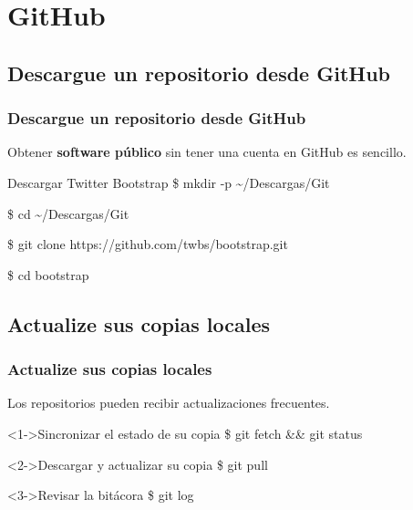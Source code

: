 %
%
%

\section{GitHub}

\subsection{Descargue un repositorio desde GitHub}
\begin{frame}
  \frametitle{Descargue un repositorio desde GitHub}
  Obtener \textbf{software público} sin tener una cuenta en GitHub es sencillo.
  \begin{block}{Descargar Twitter Bootstrap}
    \$ mkdir -p \textasciitilde/Descargas/Git\par
    \$ cd \textasciitilde/Descargas/Git\par
    \$ git clone https://github.com/twbs/bootstrap.git\par
    \$ cd bootstrap
  \end{block}
\end{frame}

\subsection{Actualize sus copias locales}
\begin{frame}
  \frametitle{Actualize sus copias locales}
  Los repositorios pueden recibir actualizaciones frecuentes.
  \begin{block}<1->{Sincronizar el estado de su copia}
    \$ git fetch \&\& git status
  \end{block}
  \begin{block}<2->{Descargar y actualizar su copia}
    \$ git pull
  \end{block}
  \begin{block}<3->{Revisar la bitácora}
    \$ git log
  \end{block}
\end{frame}




